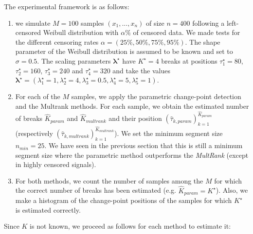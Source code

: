 The experimental framework is as follows: 
    \begin{enumerate}
        \item we simulate $M=100$ samples $(x_1,...,x_n)$ of size $n=400$  following a left-censored Weibull distribution with $\alpha\%$ of censored data. We made tests for the different censoring rates $\alpha = (25\%,50\%,75\%,95\%)$. The shape parameter of the Weibull distribution is assumed to be known and set to $\sigma=0.5$. The scaling parameters $\bm{\lambda^\star}$ have $K^\star=4$ breaks at positions $\tau^\star_1 = 80$, $\tau^\star_2 = 160$, $\tau^\star_3 = 240$ and $\tau^\star_4 = 320$ and take the values $\bm{\lambda^\star}=(\lambda^\star_1 = 1, \lambda^\star_2 = 4, \lambda^\star_3 = 0.5, \lambda^\star_4 = 5, \lambda^\star_5 = 1)$. 
        \item For each of the $M$ samples, we apply the parametric change-point detection and the Multrank methods. For each sample, we obtain the estimated number of breaks $\hat K_{param}$ and $\hat K_{multrank}$ and their position $(\hat{\tau}_{k,param})_{k = 1}^{\hat K_{param}}$ (respectively $(\hat{\tau}_{k,multrank})_{k = 1}^{\hat K_{multrank}}$). We set the minimum segment size $n_{min} =  25$. We have seen in the previous section that this is still a minimum segment size where the parametric method outperforms the \textit{MultRank} (except in highly censored signals).    
        \item For both methods, we count the number of samples among the $M$ for which the correct number of breaks has been estimated (e.g. $\hat K_{param} = K^\star$). Also, we make a histogram of the change-point positions of the samples for which $K^\star$ is estimated correctly. 
    \end{enumerate}
Since $K$ is not known, we proceed as follows for each method to estimate it:
